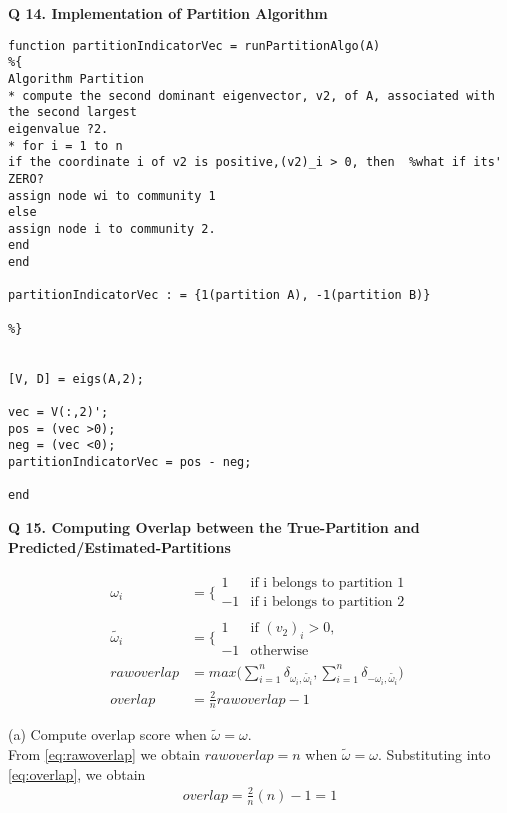 \documentclass[9pt]{article}
\begin{document}
\hrulefill



\textbf{Q 14.  Implementation of Partition Algorithm}
\begin{lstlisting}
function partitionIndicatorVec = runPartitionAlgo(A)
%{ 
Algorithm Partition
* compute the second dominant eigenvector, v2, of A, associated with the second largest
eigenvalue ?2.
* for i = 1 to n
if the coordinate i of v2 is positive,(v2)_i > 0, then  %what if its' ZERO?
assign node wi to community 1
else
assign node i to community 2.
end
end

partitionIndicatorVec : = {1(partition A), -1(partition B)}

%}


[V, D] = eigs(A,2);

vec = V(:,2)';
pos = (vec >0);
neg = (vec <0);
partitionIndicatorVec = pos - neg;

end
\end{lstlisting}
\hrulefill


\textbf{Q 15. Computing Overlap between the True-Partition and Predicted/Estimated-Partitions} 

\begin{align}
\omega_i &= \bigg\lbrace \begin{array}{cc}
1 & \text{if i belongs to partition 1}\\
-1 & \text{if i belongs to partition 2}
\end{array} \label{eq:truePartition}\\
\tilde{\omega_i}&= \bigg\lbrace \begin{array}{cc}
1 & \text{if } (v_2)_i > 0,\\
-1 & \text{otherwise}
\end{array} \label{eq:estPartition}\\ 
rawoverlap &= max \bigg( \sum_{i=1}^n  \delta_{\omega_i, \tilde{\omega_i}} ,  \sum_{i=1}^n  \delta_{-\omega_i, \tilde{\omega_i}}   \bigg) \label{eq:rawoverlap}\\
overlap &= \frac{2}{n}rawoverlap - 1 \label{eq:overlap}
\end{align}

(a) Compute overlap score when $\tilde{\omega} = \omega$.\\

From \eqref{eq:rawoverlap} we obtain $rawoverlap = n$ when $\tilde{\omega} = \omega$. Substituting into \eqref{eq:overlap}, we obtain
\begin{align*}
overlap = \frac{2}{n}(n) - 1 = 1
\end{align*}
\end{document}
